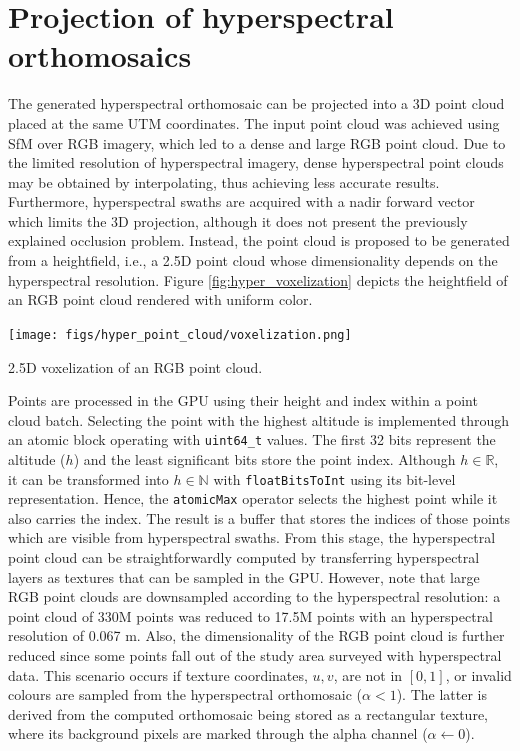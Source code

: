 \section{Projection of hyperspectral orthomosaics}

The generated hyperspectral orthomosaic can be projected into a 3D point cloud placed at the same UTM coordinates. The input point cloud was achieved using SfM over RGB imagery, which led to a dense and large RGB point cloud. Due to the limited resolution of hyperspectral imagery, dense hyperspectral point clouds may be obtained by interpolating, thus achieving less accurate results. Furthermore, hyperspectral swaths are acquired with a nadir forward vector which limits the 3D projection, although it does not present the previously explained occlusion problem. Instead, the point cloud is proposed to be generated from a heightfield, i.e., a 2.5D point cloud whose dimensionality depends on the hyperspectral resolution. Figure \ref{fig:hyper_voxelization} depicts the heightfield of an RGB point cloud rendered with uniform color.

\begin{marginfigure}[.1cm]
    \centering
    \texttt{[image: figs/hyper\_point\_cloud/voxelization.png]}
	\caption{2.5D voxelization of an RGB point cloud. }
	\label{fig:hyper_voxelization}
\end{marginfigure}
Points are processed in the GPU using their height and index within a point cloud batch. Selecting the point with the highest altitude is implemented through an atomic block operating with \verb|uint64_t| values. The first 32 bits represent the altitude ($h$) and the least significant bits store the point index. Although $h \in \mathbb{R}$, it can be transformed into $h \in \mathbb{N}$ with \verb|floatBitsToInt| using its bit-level representation. Hence, the \verb|atomicMax| operator selects the highest point while it also carries the index. The result is a buffer that stores the indices of those points which are visible from hyperspectral swaths. From this stage, the hyperspectral point cloud can be straightforwardly computed by transferring hyperspectral layers as textures that can be sampled in the GPU. However, note that large RGB point clouds are downsampled according to the hyperspectral resolution: a point cloud of 330M points was reduced to 17.5M points with an hyperspectral resolution of 0.067 \si{\meter}. Also, the dimensionality of the RGB point cloud is further reduced since some points fall out of the study area surveyed with hyperspectral data. This scenario occurs if texture coordinates, $u, v$, are not in $\left[0, 1\right]$, or invalid colours are sampled from the hyperspectral orthomosaic ($\alpha < 1$). The latter is derived from the computed orthomosaic being stored as a rectangular texture, where its background pixels are marked through the alpha channel ($\alpha \gets 0$). 

